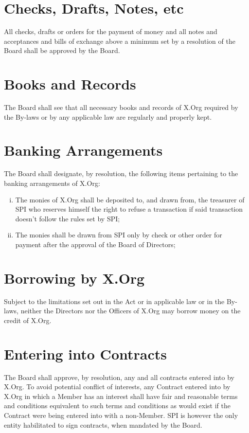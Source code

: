 \documentclass[10pt, english]{bylaws}
\begin{document}
\section{Checks, Drafts, Notes, etc}
All checks, drafts or orders for the payment of money and all notes and
acceptances
and bills of exchange above a minimum set by a resolution of the Board shall be
approved by the Board.

\section{Books and Records}
The Board shall see that all necessary books and records of X.Org required by
the By-laws or by any applicable law are regularly and properly kept.

\section{Banking Arrangements}
The Board shall designate, by resolution, the following items pertaining to the
banking arrangements of X.Org:

\begin{enumerate}[(i)\hspace{.2cm}]
	\item The monies of X.Org shall be deposited to, and drawn from, the
	treasurer of SPI who reserves himself the right to refuse a transaction
	if said transaction doesn't follow the rules set by SPI;

	\item The monies shall be drawn from SPI only by check or other order
	for payment after the approval of the Board of Directors;
\end{enumerate}

\section{Borrowing by X.Org}
Subject to the limitations set out in the Act or in applicable law or in the
By-laws, neither the Directors nor the Officers of X.Org may borrow money on the
credit of X.Org.

\section{Entering into Contracts}
\label{section_entering_contracts}
The Board shall approve, by resolution, any and all contracts entered into by
X.Org. To avoid potential conflict of interests, any Contract entered into by
X.Org in which a Member has an interest shall have fair and reasonable terms and
conditions equivalent to such terms and conditions as would exist if the
Contract were being entered into with a non-Member. SPI is however the only
entity habilitated to sign contracts, when mandated by the Board.
\end{document}
